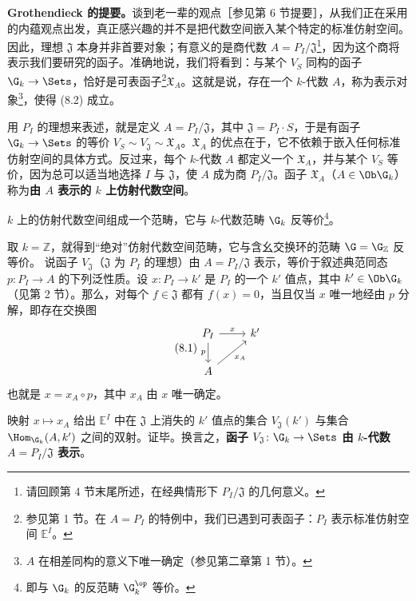 \textbf{Grothendieck 的提要。}谈到老一辈的观点［参见第 6 节提要］，从我们正在采用的内蕴观点出发，真正感兴趣的并不是把代数空间嵌入某个特定的标准仿射空间。因此，理想 $\mathfrak J$ 本身并非首要对象；有意义的是商代数 $A=P_I/\mathfrak J$\footnote{请回顾第 4 节末尾所述，在经典情形下 $P_I/\mathfrak J$ 的几何意义。}，因为这个商将表示我们要研究的函子。准确地说，我们将看到：与某个 $V_S$ 同构的函子 $\G_k\to\Sets$，恰好是可表函子\footnote{参见第 1 节。在 $A=P_I$ 的特例中，我们已遇到可表函子：$P_I$ 表示标准仿射空间 $\mathbb E^I$。}$\mathfrak X_A$。这就是说，存在一个 $k$-代数 $A$，称为表示对象\footnote{$A$ 在相差同构的意义下唯一确定（参见第二章第 1 节）。}，使得 (8.2) 成立。

用 $P_I$ 的理想来表述，就是定义 $A=P_I/\mathfrak J$，其中 $\mathfrak J=P_I\cdot S$，于是有函子 $\G_k\to\Sets$ 的等价 $V_S\sim V_{\mathfrak J}\sim\mathfrak X_A$。$\mathfrak X_A$ 的优点在于，它不依赖于嵌入任何标准仿射空间的具体方式。反过来，每个 $k$-代数 $A$ 都定义一个 $\mathfrak X_A$，并与某个 $V_S$ 等价，因为总可以适当地选择 $I$ 与 $\mathfrak J$，使 $A$ 成为商 $P_I/\mathfrak J$。函子 $\mathfrak X_A$（$A\in\Ob\G_k$）称为\textbf{由 $A$ 表示的 $k$ 上仿射代数空间}。

$k$ 上的仿射代数空间组成一个范畴，它与 $k$-代数范畴 $\G_k$ 反等价\footnote{即与 $\G_k$ 的反范畴 $\G_k^{\op}$ 等价。}。

取 $k=\mathbb Z$，就得到“绝对”仿射代数空间范畴，它与含幺交换环的范畴 $\G=\G_{\mathbb Z}$ 反等价。
说函子 $V_{\mathfrak J}$（$\mathfrak J$ 为 $P_I$ 的理想）由 $A=P_I/\mathfrak J$ 表示，等价于叙述典范同态 $p\colon P_I\to A$ 的下列泛性质。设 $x\colon P_I\to k'$ 是 $P_I$ 的一个 $k'$ 值点，其中 $k'\in\Ob\G_k$（见第 2 节）。那么，对每个 $f\in\mathfrak J$ 都有 $f(x)=0$，当且仅当 $x$ 唯一地经由 $p$ 分解，即存在交换图
\begin{equation}\tag{8.1}
\begin{tikzcd}[ampersand replacement=\&]P_I\arrow[r,"x"]\arrow[d,"p"']\&k'\\A\arrow[ur,"x_A"']\&\end{tikzcd}
\end{equation}
也就是 $x=x_A\circ p$，其中 $x_A$ 由 $x$ 唯一确定。

映射 $x\mapsto x_A$ 给出 $\mathbb E^I$ 中在 $\mathfrak J$ 上消失的 $k'$ 值点的集合 $V_{\mathfrak J}(k')$ 与集合 $\Hom_{\G_k}(A,k')$ 之间的双射。证毕。换言之，\textbf{函子 $V_{\mathfrak J}\colon\G_k\to\Sets$ 由 $k$-代数 $A=P_I/\mathfrak J$ 表示}。

